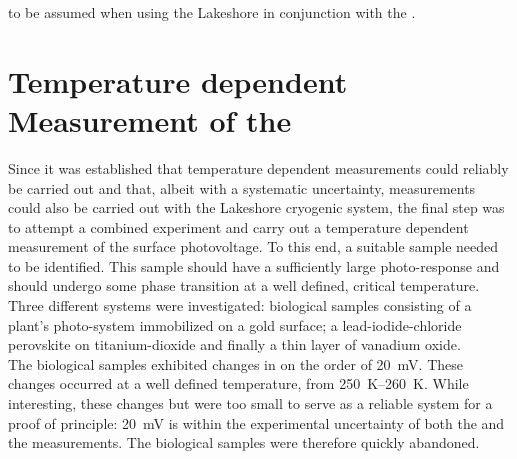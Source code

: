 to be assumed when using the Lakeshore in conjunction with the \led{}.


\section{Temperature dependent Measurement of the \spv{}}
Since it was established that temperature dependent \cpd{} measurements could reliably be carried out and that, albeit with a systematic uncertainty, \spv{} measurements could also be carried out with the Lakeshore cryogenic system, the final step was to attempt a combined experiment and carry out a temperature dependent measurement of the surface photovoltage. To this end, a suitable sample needed to be identified. This sample should have a sufficiently large photo-response and should undergo some phase transition at a well defined, critical temperature. Three different systems were investigated: biological samples consisting of a plant's photo-system immobilized on a gold surface; a lead-iodide-chloride perovskite on titanium-dioxide and finally a thin layer of vanadium oxide.\\
The biological samples exhibited changes in \cpd{} on the order of \SI{20}{\milli\volt}. These changes occurred at a well defined temperature, from \SIrange{250}{260}{\kelvin}. While interesting, these changes but were too small to serve as a reliable system for a proof of principle: \SI{20}{\milli\volt} is within the experimental uncertainty of both the \cpd{} and the \spv{} measurements. The biological samples were therefore quickly abandoned.\\
